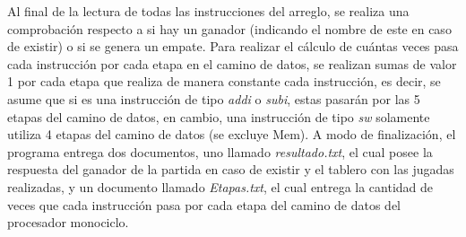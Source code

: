  \noindent Al final de la lectura de todas las instrucciones del arreglo, se realiza una comprobación respecto a si hay un ganador (indicando el nombre de este en caso de existir) o si se genera un empate. Para realizar el cálculo de cuántas veces pasa cada instrucción por cada etapa en el camino de datos, se realizan sumas de valor 1 por cada etapa que realiza de manera constante cada instrucción, es decir, se asume que si es una instrucción de tipo \textit{addi} o \textit{subi}, estas pasarán por las 5 etapas del camino de datos, en cambio, una instrucción de tipo \textit{sw} solamente utiliza 4 etapas del camino de datos (se excluye Mem). A modo de finalización, el programa entrega dos documentos, uno llamado \textit{resultado.txt}, el cual posee la respuesta del ganador de la partida en caso de existir y el tablero con las jugadas realizadas, y un documento llamado \textit{Etapas.txt}, el cual entrega la cantidad de veces que cada instrucción pasa por cada etapa del camino de datos del procesador monociclo.
